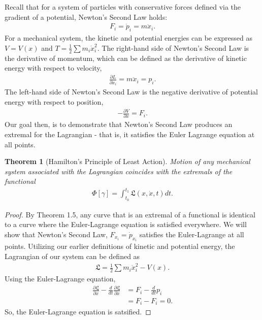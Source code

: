 \documentclass[psamsfonts]{amsart}
\newtheorem{thm}{Theorem}[section]
\theoremstyle{definition}
\theoremstyle{remark}
\numberwithin{equation}{section}
\begin{document}
Recall that for a system of particles with conservative forces defined via the gradient of a potential, Newton's Second Law holds:
\begin{align*}
  F_i = \dot{p}_i = m \ddot{x}_i. 
\end{align*}
For a mechanical system, the kinetic and potential energies can be expressed as $V = V(x)$ and $T = \frac{1}{2} \sum m_i \dot{x}_i^2$.
The right-hand side of Newton's Second Law is the derivative of momentum, which can be defined as the derivative of kinetic energy with respect to velocity,
\begin{align*}
  \frac{\partial L }{\partial \dot{x}_i} = m\ddot{x}_i = p_i.
\end{align*}
The left-hand side of Newton's Second Law is the negative derivative of potential energy with respect to position,
\begin{align*}
  -\frac{\partial V}{\partial x} = F_i.
 \end{align*}
Our goal then, is to demonstrate that Newton's Second Law produces an extremal for the Lagrangian - that is, it satisfies the Euler Lagrange equation at all points.

\begin{thm}[Hamilton's Principle of Least Action]
Motion of any mechanical system associated with the Lagrangian coincides with the extremals of the functional
\begin{align*}
  \Phi[\gamma] = \int_{t_0}^{t_1} \mathfrak{L}  (x, \dot{x}, t)dt.
\end{align*}
\end{thm}

\begin{proof}
By Theorem 1.5, any curve that is an extremal of a functional is identical to a curve where the Euler-Lagrange equation is satisfied everywhere. We will show that Newton's Second Law, $F_{x_i} = \dot{p}_{x_i}$ satisfies the Euler-Lagrange at all points. Utilizing our earlier definitions of kinetic and potential energy, the Lagrangian of our system can be defined as
\begin{align*}
  \mathfrak{L} = \frac{1}{2} \sum m_i \dot{x}_i^2 - V(x).
\end{align*}
Using the Euler-Lagrange equation,
\begin{align*}
  \frac{\partial \mathfrak{L}}{\partial x} - \frac{d}{dt} \frac{\partial \mathfrak{L}}{\partial \dot{x}} &= F_i - \frac{d}{dt}p_i \\
  &= F_i - F_i = 0.
\end{align*}
So, the Euler-Lagrange equation is satsified.
\end{proof}
\end{document}
